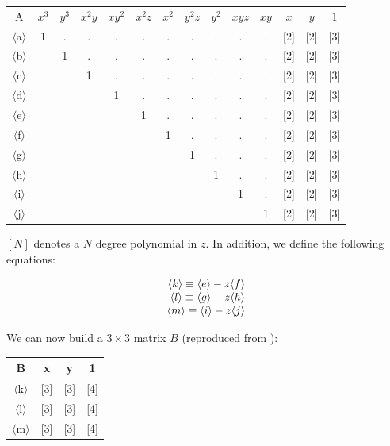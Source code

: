 \documentclass[11pt]{report}
\begin{document}
\begin{center}
\begin{tabular}{|c| c c c c c c c c c c c c c|}
  \hline
  A & $x^3$ & $y^3$ & $x^2y$ & $xy^2$ & $x^2z$ & $x^2$ & $y^2z$ & $y^2$ & $xyz$ & $xy$ & $x$ & $y$ & $1$ \\
  $\langle$a$\rangle$ & 1 & . & . & . & . & . & . & . & . & . & [2] & [2] & [3] \\
  $\langle$b$\rangle$ & & 1 & . & . & . & . & . & . & . & . & [2] & [2] & [3] \\
  $\langle$c$\rangle$ & & & 1 & . & . & . & . & . & . & . & [2] & [2] & [3] \\
  $\langle$d$\rangle$ & & & & 1 & . & . & . & . & . & . & [2] & [2] & [3] \\
  $\langle$e$\rangle$ & & & & & 1 & . & . & . & . & . & [2] & [2] & [3] \\
  $\langle$f$\rangle$ & & & & & & 1 & . & . & . & . & [2] & [2] & [3] \\
  $\langle$g$\rangle$ & & & & & & & 1 & . & . & . & [2] & [2] & [3] \\
  $\langle$h$\rangle$ & & & & & & & & 1 & . & . & [2] & [2] & [3] \\
  $\langle$i$\rangle$ & & & & & & & & & 1 & . & [2] & [2] & [3] \\
  $\langle$j$\rangle$ & & & & & & & & & & 1 & [2] & [2] & [3] \\
  \hline
\end{tabular}
\end{center}
$[N]$ denotes a $N$ degree polynomial in $z$. In addition, we define the following equations: 

\[
  \begin{array}{r c l}
    \langle k \rangle \equiv \langle e \rangle - z \langle f \rangle \\
    \langle l \rangle \equiv \langle g \rangle - z \langle h \rangle \\
    \langle m \rangle \equiv \langle i \rangle - z \langle j \rangle \\
  \end{array}
\]

We can now build a $3\times 3$ matrix $B$ (reproduced from \cite{FivePointNister04}):

\begin{center}
\begin{tabular}{|c| c c c|}
  \hline
  B & x & y & 1 \\
  \hline
  $\langle$k$\rangle$ & [3] & [3] & [4] \\
  $\langle$l$\rangle$ & [3] & [3] & [4] \\
  $\langle$m$\rangle$ & [3] & [3] & [4] \\
  \hline
\end{tabular}
\end{center}
\end{document}
